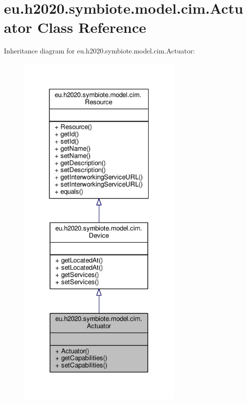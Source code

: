 \hypertarget{classeu_1_1h2020_1_1symbiote_1_1model_1_1cim_1_1Actuator}{}\section{eu.\+h2020.\+symbiote.\+model.\+cim.\+Actuator Class Reference}
\label{classeu_1_1h2020_1_1symbiote_1_1model_1_1cim_1_1Actuator}


Inheritance diagram for eu.\+h2020.\+symbiote.\+model.\+cim.\+Actuator\+:\nopagebreak
\begin{figure}[H]
\begin{center}
\leavevmode
\includegraphics[width=232pt]{classeu_1_1h2020_1_1symbiote_1_1model_1_1cim_1_1Actuator__inherit__graph}
\end{center}
\end{figure}



